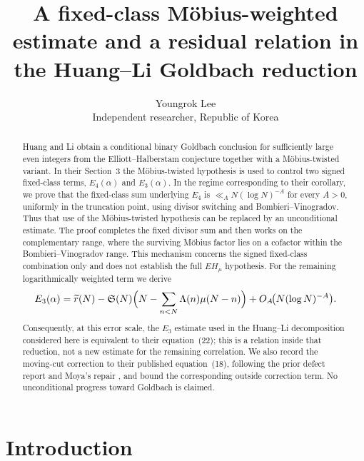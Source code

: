 \documentclass[11pt,a4paper]{article}
\title{A fixed-class M\"obius-weighted estimate and a residual relation in the Huang--Li Goldbach reduction}
\author{Youngrok Lee\\
\small Independent researcher, Republic of Korea}
\date{}
\theoremstyle{plain}
\theoremstyle{definition}
\theoremstyle{remark}
\begin{document}
\maketitle

\begin{abstract}
Huang and Li \cite{HL} obtain a conditional binary Goldbach conclusion for
sufficiently large even integers from the Elliott--Halberstam conjecture
together with a M\"obius-twisted variant.  In their Section~3 the
M\"obius-twisted hypothesis is used to control two signed fixed-class terms,
$E_4(\alpha)$ and $E_3(\alpha)$.  In the regime corresponding to their
corollary, we prove that the fixed-class sum underlying $E_4$ is
$\ll_A N(\log N)^{-A}$ for every $A>0$, uniformly in the truncation
point, using divisor switching and Bombieri--Vinogradov.  Thus that use of
the M\"obius-twisted hypothesis can be replaced by an unconditional
estimate.  The proof completes the fixed divisor sum and then works on the
complementary range, where the surviving M\"obius factor lies on a
cofactor within the Bombieri--Vinogradov range.  This mechanism concerns
the signed fixed-class combination only and does not establish the full
$EH_\mu$ hypothesis.  For the remaining logarithmically weighted term we derive
\[
E_3(\alpha)=\widetilde r(N)-\mathfrak S(N)
\Bigl(N-\sum_{n<N}\Lambda(n)\mu(N-n)\Bigr)
+O_A\!\bigl(N(\log N)^{-A}\bigr).
\]
Consequently, at this error scale, the $E_3$ estimate used in the
Huang--Li decomposition considered here is equivalent to their
equation~(22); this is a relation inside that reduction, not a new
estimate for the remaining correlation.  We also record the moving-cut correction to their published
equation~(18), following the prior defect report and Moya's repair
\cite{Moya}, and bound the corresponding outside correction term.  No
unconditional progress toward Goldbach is claimed.
\end{abstract}


\section{Introduction}
\label{sec:intro}
\end{document}
